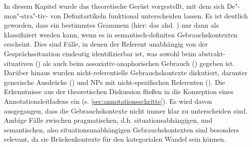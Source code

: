In diesem Kapitel wurde das theoretische Gerüst vorgestellt, mit dem sich De"-mon"-stra"-tiv-  von Definitartikeln funktional unterscheiden lassen. Es ist deutlich geworden, dass ein bestimmtes Grammem (hier: das ahd. ) nur dann als  klassifiziert werden kann, wenn es in semantisch-definiten Gebrauchskontexten  \parencite{Lobner1985} erscheint. Dies sind Fälle, in denen der Referent unabhängig von der Gesprächssituation eindeutig identifizierbar ist, was  sowohl beim abstrakt-situativen  () als auch beim assoziativ-anaphorischen  Gebrauch () gegeben ist. Darüber hinaus wurden nicht-referentielle  Gebrauchskontexte diskutiert, darunter generische  Ausdrücke () und NPs  mit nicht-spezifischen  Referenten (). Die Erkenntnisse aus der theoretischen Diskussion fließen in die Konzeption eines Annotationsleitfadens  ein (s. \ref{sec:annotationsschritte}). Es wird davon ausgegangen, dass die Gebrauchskontexte nicht immer klar zu unterscheiden sind. Ambige Fälle zwischen pragmatischen, d.h. situationsabhängigen,  und semantischen, also situationsunabhängigen  Gebrauchskontexten sind besonders relevant, da sie Brückenkontexte  für den kategorialen Wandel sein können. 
